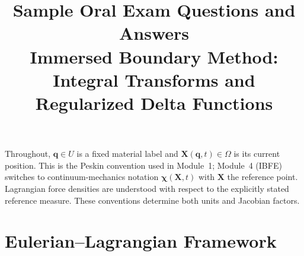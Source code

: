 \documentclass[11pt]{article}
\title{Sample Oral Exam Questions and Answers\\
Immersed Boundary Method: Integral Transforms and Regularized Delta Functions}
\author{}
\date{}
\begin{document}
\maketitle

Throughout, $\mathbf{q}\in U$ is a fixed material label and
$\mathbf{X}(\mathbf{q},t)\in\Omega$ is its current position. This is the Peskin
convention used in Module~1; Module~4 (IBFE) switches to continuum-mechanics
notation $\boldsymbol{\chi}(\mathbf{X},t)$ with $\mathbf{X}$ the reference point.
Lagrangian force densities are understood with respect to the explicitly stated
reference measure. These conventions determine both units and Jacobian factors.

\section*{Eulerian--Lagrangian Framework}
\end{document}
